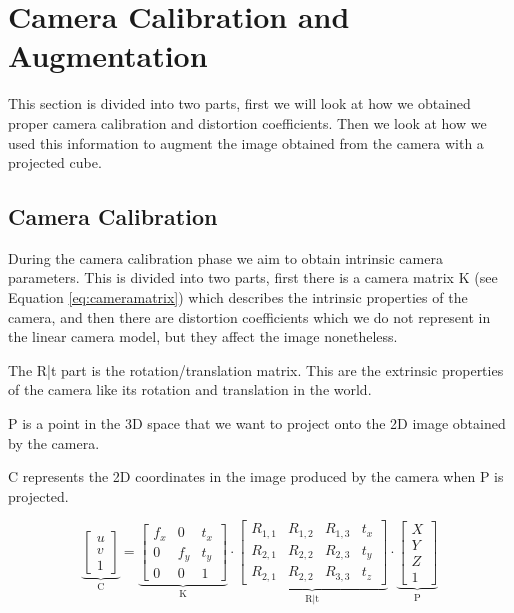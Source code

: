 \section{Camera Calibration and Augmentation}

This section is divided into two parts, first we will look at how we obtained proper camera calibration and distortion coefficients. Then we look at how we used this information to augment the image obtained from the camera with a projected cube.

\subsection{Camera Calibration}

During the camera calibration phase we aim to obtain intrinsic camera parameters. This is divided into two parts, first there is a camera matrix K (see Equation \ref{eq:cameramatrix}) which describes the intrinsic properties of the camera, and then there are distortion coefficients which we do not represent in the linear camera model, but they affect the image nonetheless. 

The R|t part is the rotation/translation matrix. This are the extrinsic properties of the camera like its rotation and translation in the world.

P is a point in the 3D space that we want to project onto the 2D image obtained by the camera. 

C represents the 2D coordinates in the image produced by the camera when P is projected.

\begin{equation}
	\underbrace{
		\begin{bmatrix}
			u \\
			v \\
			1
		\end{bmatrix}
	}_\text{C}
	=
	\underbrace{
		\begin{bmatrix}
			f_{x} & 0 & t_{x} \\
			0 & f_{y} & t_{y} \\
			0 & 0 & 1
		\end{bmatrix}
	}_\text{K}
	\cdot
	\underbrace{
		\begin{bmatrix}
			R_{1,1} & R_{1,2} & R_{1,3} & t_{x} \\
			R_{2,1} & R_{2,2} & R_{2,3} & t_{y} \\
			R_{2,1} & R_{2,2} & R_{3,3} & t_{z}
		\end{bmatrix}
	}_\text{R|t}
	\cdot
	\underbrace{
		\begin{bmatrix}
			X \\
			Y \\
			Z \\
			1
		\end{bmatrix}
	}_\text{P}
	\label{eq:cameramatrix}
\end{equation}

